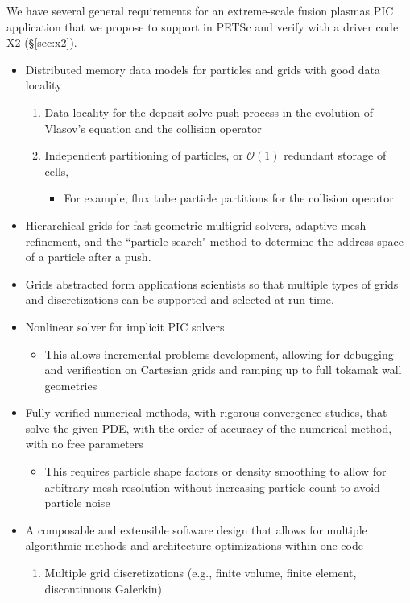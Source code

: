 \documentclass[review]{siamart}
\newcommand{\Order}[1]{\ensuremath{\mathcal{O}(#1)}}    %
\begin{document}
We have several general requirements for an extreme-scale fusion plasmas PIC application that we propose to support in PETSc and verify with a driver code X2 (\S\ref{sec:x2}).
\begin{itemize}
\item Distributed memory data models for particles and grids with good data locality
\begin{enumerate}
\item Data locality for the deposit-solve-push process in the evolution of Vlasov's equation and the collision operator
\item Independent partitioning of particles, or \Order{1} redundant storage of cells,
\begin{itemize}
\item For example, flux tube particle partitions for the collision operator
\end{itemize}
\end{enumerate}
\item Hierarchical grids for fast geometric multigrid solvers, adaptive mesh refinement, and the ``particle search" method to determine the address space of a particle after a push.
\item Grids abstracted form applications scientists so that multiple types of grids and discretizations can be supported and selected at run time.
\item Nonlinear solver for implicit PIC solvers \cite{BruneKnepleySmithTu15}
\begin{itemize}
\item This allows incremental problems development, allowing for debugging and verification on Cartesian grids and ramping up to full tokamak wall geometries 
\end{itemize}
\item Fully verified numerical methods, with rigorous convergence studies, that solve the given PDE, with the order of accuracy of the numerical method, with no free parameters
\begin{itemize}
\item This requires particle shape factors or density smoothing to allow for arbitrary mesh resolution without increasing particle count to avoid particle noise
\end{itemize}
\item A composable and extensible software design that allows for multiple algorithmic methods and architecture optimizations within one code
\begin{enumerate}
\item Multiple grid discretizations (e.g., finite volume, finite element, discontinuous Galerkin)

\end{enumerate}
\end{itemize}
\end{document}

